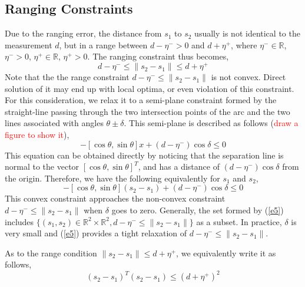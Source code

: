 \documentclass[journal]{IEEEtran}
\begin{document}
\subsection{Ranging Constraints}
Due to the ranging error,  the distance from $s_1$ to $s_2$ usually is not identical to the measurement $d$, but in a range between $d-\eta^->0$ and $d+\eta^+$, where $\eta^-\in\mathbb{R}$, $\eta^->0$, $\eta^+\in\mathbb{R}$, $\eta^+>0$. The ranging constraint thus becomes,
\begin{equation}\label{e3}
d-\eta^-\leq \|s_2-s_1\|\leq d+\eta^+
\end{equation}
Note that the the range constraint $d-\eta^-\leq \|s_2-s_1\|$ is not convex. Direct solution of it may end up with local optima, or even violation of this constraint. For this consideration, we relax it to a semi-plane constraint formed by the straight-line passing through the two intersection points of the arc and the two lines associated with angles $\theta\pm\delta$. This semi-plane is described as follows  (\textcolor{red}{draw a figure to show it}),
\begin{equation}\label{e4}
-[\cos\theta, \sin\theta]x+(d-\eta^-)\cos\delta\leq 0
\end{equation}
This equation can be obtained directly by noticing that the separation line is normal to the vector $[\cos\theta, \sin\theta]^T$, and has a distance of $(d-\eta^-)\cos\delta$ from the origin. Therefore, we have the following equivalently for $s_1$ and $s_2$,
\begin{equation}\label{e5}
-[\cos\theta, \sin\theta](s_2-s_1)+(d-\eta^-)\cos\delta\leq 0
\end{equation}
This convex constraint approaches the non-convex constraint $d-\eta^-\leq\|s_2-s_1\|$ when $\delta$ goes to zero. Generally, the set formed by (\ref{e5}) includes $\{(s_1, s_2)\in\mathbb{R}^2\times \mathbb{R}^2, d-\eta^-\leq\|s_2-s_1\|\}$ as a subset. In practice, $\delta$ is very small and (\ref{e5}) provides a tight relaxation of $d-\eta^-\leq\|s_2-s_1\|$.

As to the range condition $\|s_2-s_1\|\leq d+\eta^+$, we equivalently write it as follows,
\begin{equation}\label{e6}
(s_2-s_1)^T(s_2-s_1) \leq (d+\eta^+)^2
\end{equation}
\end{document}
